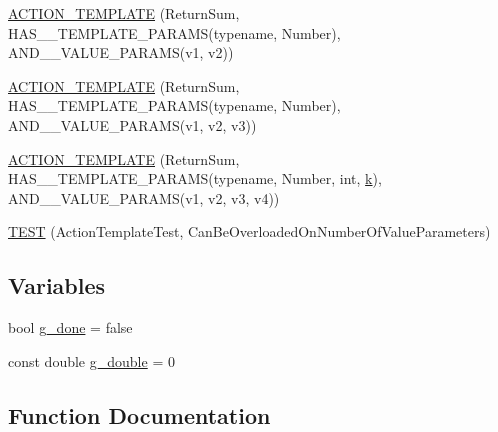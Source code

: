 \begin{DoxyCompactItemize}
\item 
\hyperlink{namespacetesting_1_1gmock__generated__actions__test_a0d95dcce021580cf2a2af2a91348a01b}{A\+C\+T\+I\+O\+N\+\_\+\+T\+E\+M\+P\+L\+A\+TE} (Return\+Sum, H\+A\+S\+\_\+\_\+\+T\+E\+M\+P\+L\+A\+T\+E\+\_\+\+P\+A\+R\+A\+MS(typename, Number), A\+N\+D\+\_\+\_\+\+V\+A\+L\+U\+E\+\_\+\+P\+A\+R\+A\+MS(v1, v2))
\item 
\hyperlink{namespacetesting_1_1gmock__generated__actions__test_a5241672e22af49093d3601ac42c9a5ca}{A\+C\+T\+I\+O\+N\+\_\+\+T\+E\+M\+P\+L\+A\+TE} (Return\+Sum, H\+A\+S\+\_\+\_\+\+T\+E\+M\+P\+L\+A\+T\+E\+\_\+\+P\+A\+R\+A\+MS(typename, Number), A\+N\+D\+\_\+\_\+\+V\+A\+L\+U\+E\+\_\+\+P\+A\+R\+A\+MS(v1, v2, v3))
\item 
\hyperlink{namespacetesting_1_1gmock__generated__actions__test_a03e55dabaa60ff2cda602c702ef3ff76}{A\+C\+T\+I\+O\+N\+\_\+\+T\+E\+M\+P\+L\+A\+TE} (Return\+Sum, H\+A\+S\+\_\+\_\+\+T\+E\+M\+P\+L\+A\+T\+E\+\_\+\+P\+A\+R\+A\+MS(typename, Number, int, \hyperlink{jquery_8js_ab26645c014aa005ecedef329ecf58c99}{k}), A\+N\+D\+\_\+\_\+\+V\+A\+L\+U\+E\+\_\+\+P\+A\+R\+A\+MS(v1, v2, v3, v4))
\item 
\hyperlink{namespacetesting_1_1gmock__generated__actions__test_aa84c5b4f29e052340459e12649ce7209}{T\+E\+ST} (Action\+Template\+Test, Can\+Be\+Overloaded\+On\+Number\+Of\+Value\+Parameters)
\end{DoxyCompactItemize}
\subsection*{Variables}
\begin{DoxyCompactItemize}
\item 
bool \hyperlink{namespacetesting_1_1gmock__generated__actions__test_a5f828d39e27f0615498d5aa31c96916e}{g\+\_\+done} = false
\item 
const double \hyperlink{namespacetesting_1_1gmock__generated__actions__test_aa10d8101300a51dd20ab028fa9971313}{g\+\_\+double} = 0
\end{DoxyCompactItemize}


\subsection{Function Documentation}
